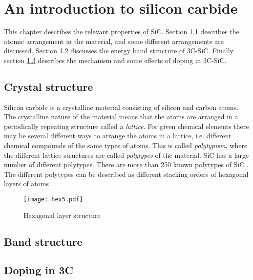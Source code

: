 





\chapter{An introduction to silicon carbide}
\label{sec:sic}
This chapter describes the relevant properties of SiC. Section \ref{sec:crystal_structure} describes the atomic arrangement in the material, and some different arrangements are discussed. Section \ref{sec:band_structure} discusses the energy band structure of 3C-SiC. Finally section \ref{sec:doping_in_3C} describes the mechanism and some effects of doping in 3C-SiC. 

\section{Crystal structure}
\label{sec:crystal_structure}
Silicon carbide is a crystalline material consisting of silicon and carbon atoms. The crystalline nature of the material means that the atoms are arranged in a periodically repeating structure called a \emph{lattice}. For given chemical elements there may be several different ways to arrange the atoms in a lattice, i.e. different chemical compounds of the same types of atoms. This is called \emph{polytypism}, where the different lattice structures are called \emph{polytypes} of the material. SiC has a large number of different polytypes. There are more than 250 known polytypes of SiC \cite{Cheung2006}. The different polytypes can be described as different stacking orders of hexagonal layers of atoms \cite{Mirgorodsky1995}. 


\begin{figure}
\begin{center}
\texttt{[image: hex5.pdf]}
\caption{Hexagonal layer structure
\label{fig:hex}}
\end{center}
\end{figure}


\section{Band structure}
\label{sec:band_structure}


\section{Doping in 3C}
\label{sec:doping_in_3C}

